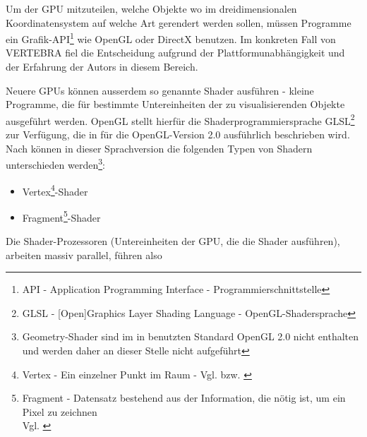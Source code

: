 \documentclass[a4paper,titlepage,12pt]{scrartcl}
\begin{document}
Um der GPU mitzuteilen, welche Objekte wo im dreidimensionalen Koordinatensystem auf welche Art gerendert werden sollen, müssen Programme ein Grafik-API\footnote{API - Application Programming Interface - Programmierschnittstelle} wie OpenGL oder DirectX benutzen. Im konkreten Fall von VERTEBRA fiel die Entscheidung aufgrund der Plattformunabhängigkeit und der Erfahrung der Autors in diesem Bereich.

Neuere GPUs können ausserdem so genannte Shader ausführen - kleine Programme, die für bestimmte Untereinheiten der zu visualisierenden Objekte ausgeführt werden. OpenGL stellt hierfür die Shaderprogrammiersprache GLSL\footnote{GLSL - [Open]Graphics Layer Shading Language - OpenGL-Shadersprache} zur Verfügung, die in \cite{Rost2006} für die OpenGL-Version 2.0 ausführlich beschrieben wird. Nach \cite[Seite 38-47]{Rost2006} können in dieser Sprachversion die folgenden Typen von Shadern unterschieden werden\footnote{Geometry-Shader sind im in \cite{Rost2006} benutzten Standard OpenGL 2.0 nicht enthalten und werden daher an dieser Stelle nicht aufgeführt}:
\begin{itemize}
 \item Vertex\footnote{Vertex - Ein einzelner Punkt im Raum - Vgl. \cite[Seite 664]{Wright2000} bzw. \cite[Seite 685]{Rost2006}}-Shader
 \item Fragment\footnote{Fragment - Datensatz bestehend aus der Information, die nötig ist, um ein Pixel zu zeichnen\\Vgl. \cite[Seite 675]{Rost2006}}-Shader
\end{itemize}
Die Shader-Prozessoren (Untereinheiten der GPU, die die Shader ausführen), arbeiten massiv parallel, führen also
\end{document}
